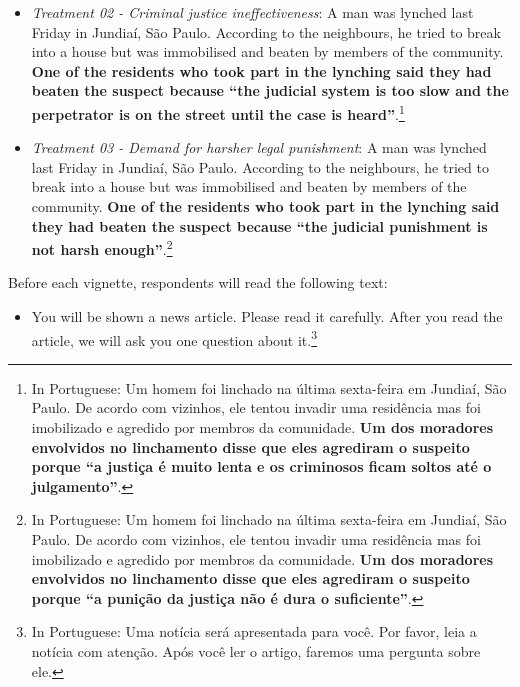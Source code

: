 \documentclass[12pt,a4paper,]{article}
\providecommand{\tightlist}{%
   \setlength{\itemsep}{0pt}\setlength{\parskip}{0pt}}
\begin{document}
\begin{itemize}
\tightlist
\item
  \emph{Treatment 02 - Criminal justice ineffectiveness}: A man was
  lynched last Friday in Jundiaí, São Paulo. According to the
  neighbours, he tried to break into a house but was immobilised and
  beaten by members of the community. \textbf{One of the residents who
  took part in the lynching said they had beaten the suspect because
  ``the judicial system is too slow and the perpetrator is on the street
  until the case is heard''}.\footnote{In Portuguese: Um homem foi
    linchado na última sexta-feira em Jundiaí, São Paulo. De acordo com
    vizinhos, ele tentou invadir uma residência mas foi imobilizado e
    agredido por membros da comunidade. \textbf{Um dos moradores
    envolvidos no linchamento disse que eles agrediram o suspeito porque
    ``a justiça é muito lenta e os criminosos ficam soltos até o
    julgamento''}.}
\end{itemize}

\begin{itemize}
\tightlist
\item
  \emph{Treatment 03 - Demand for harsher legal punishment}: A man was
  lynched last Friday in Jundiaí, São Paulo. According to the
  neighbours, he tried to break into a house but was immobilised and
  beaten by members of the community. \textbf{One of the residents who
  took part in the lynching said they had beaten the suspect because
  ``the judicial punishment is not harsh enough''}.\footnote{In
    Portuguese: Um homem foi linchado na última sexta-feira em Jundiaí,
    São Paulo. De acordo com vizinhos, ele tentou invadir uma residência
    mas foi imobilizado e agredido por membros da comunidade. \textbf{Um
    dos moradores envolvidos no linchamento disse que eles agrediram o
    suspeito porque ``a punição da justiça não é dura o suficiente''}.}
\end{itemize}

Before each vignette, respondents will read the following text:

\begin{itemize}
\tightlist
\item
  You will be shown a news article. Please read it carefully. After you
  read the article, we will ask you one question about it.\footnote{In
    Portuguese: Uma notícia será apresentada para você. Por favor, leia
    a notícia com atenção. Após você ler o artigo, faremos uma pergunta
    sobre ele.}
\end{itemize}
\end{document}

